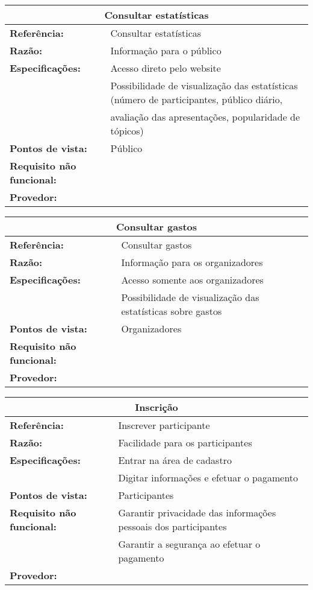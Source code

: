 \documentclass[letter]{article}
\begin{document}
%
\begin{table}[h!]\begin{center}
\begin{tabular}{|ll|}
\hline 
\multicolumn{2}{|c|}{\textbf{Consultar estatísticas}}\tabularnewline
\hline
\textbf{Referência:} & Consultar estatísticas\tabularnewline
\textbf{Razão:} & Informação para o público\tabularnewline
\textbf{Especificações:} & Acesso direto pelo website\tabularnewline
 & Possibilidade de visualização das estatísticas (número de participantes,
público diário,\tabularnewline
 & avaliação das apresentações, popularidade de tópicos)\tabularnewline
\textbf{Pontos de vista:} & Público\tabularnewline
\textbf{Requisito não funcional:} & \tabularnewline
\textbf{Provedor:} & \tabularnewline
\hline\end{tabular}\end{center}
\end{table}


%
\begin{table}[h!]\begin{center}
\begin{tabular}{|ll|}
\hline 
\multicolumn{2}{|c|}{\textbf{Consultar gastos}}\tabularnewline
\hline
\textbf{Referência:} & Consultar gastos\tabularnewline
\textbf{Razão:} & Informação para os organizadores\tabularnewline
\textbf{Especificações:} & Acesso somente aos organizadores\tabularnewline
 & Possibilidade de visualização das estatísticas sobre gastos\tabularnewline
\textbf{Pontos de vista:} & Organizadores\tabularnewline
\textbf{Requisito não funcional:} & \tabularnewline
\textbf{Provedor:} & \tabularnewline
\hline\end{tabular}\end{center}
\end{table}


%
\begin{table}[h!]\begin{center}
\begin{tabular}{|ll|}
\hline 
\multicolumn{2}{|c|}{\textbf{Inscrição}}\tabularnewline
\hline
\textbf{Referência:} & Inscrever participante\tabularnewline
\textbf{Razão:} & Facilidade para os participantes\tabularnewline
\textbf{Especificações:} & Entrar na área de cadastro\tabularnewline
 & Digitar informações e efetuar o pagamento\tabularnewline
\textbf{Pontos de vista:} & Participantes\tabularnewline
\textbf{Requisito não funcional:} & Garantir privacidade das informações pessoais dos participantes \tabularnewline
 & Garantir a segurança ao efetuar o pagamento\tabularnewline
\textbf{Provedor:} & \tabularnewline
\hline\end{tabular}\end{center}
\end{table}
\end{document}

